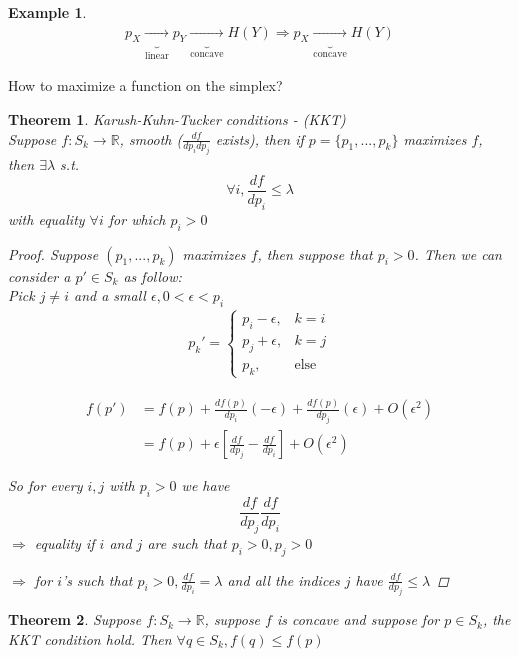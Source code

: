\documentclass[twoside]{article}
\newtheorem{theorem}{Theorem}[section]
\theoremstyle{definition} %
\newtheorem{example}{Example}
\def\R{\mathbb{R}}
\begin{document}
\begin{appendices}
\begin{example}
  \begin{align*}
    p_X \underbrace{\longrightarrow}_{\text{linear}} p_Y \underbrace{\longrightarrow}_{\text{concave}} H(Y)
    \Longrightarrow p_X \underbrace{\longrightarrow}_{\text{concave}} H(Y)
  \end{align*}
\end{example}

How to maximize a function on the simplex?

\begin{theorem}{Karush-Kuhn-Tucker conditions - (KKT)} \\
  Suppose $f: S_k \rightarrow \R$, smooth ($\frac{df}{dp_i dp_j}$ exists), then if $p = \{ p_1, ..., p_k\}$ maximizes $f$, then $\exists \lambda$ s.t.
  \[ \forall i, \frac{df}{d p_i} \leq \lambda \]
  with equality $\forall i$ for which $p_i > 0$

\begin{proof}
  Suppose $(p_1, ..., p_k)$ maximizes $f$, then suppose that $p_i > 0$. Then we can consider a $p' \in S_k$ as follow:\\
  Pick $j \neq i$ and a small $\epsilon, 0 < \epsilon < p_i$
  \begin{align*}
    p_k' =
    \left\{
    \begin{array}{ll}
      p_i - \epsilon, &k = i \\
      p_j + \epsilon, & k = j \\
      p_k, &\text{else}
    \end{array}
    \right.
  \end{align*}

  \begin{align*}
    f(p') &= f(p) + \frac{d f(p)}{d p_i}(- \epsilon) + \frac{d f(p)}{d p_j} (\epsilon) + O(\epsilon^2) \\
    &= f(p) + \epsilon \left[ \frac{df}{dp_j} - \frac{df}{dp_i} \right] + O(\epsilon^2)
  \end{align*}

  So for every $i, j$ with $p_i > 0$ we have
  \[ \frac{df}{dp_j} \frac{df}{dp_i} \]
  $\Rightarrow$ equality if $i$ and $j$ are such that $p_i > 0, p_j > 0$

  $\Rightarrow$ for $i$'s such that $p_i > 0, \frac{df}{dp_i} = \lambda$ and all the indices $j$ have $\frac{df}{dp_j} \leq \lambda$
\end{proof}

\end{theorem}

\begin{theorem}
  Suppose $f: S_k \rightarrow \R$, suppose $f$ is concave and suppose for $p \in S_k$, the KKT condition hold. Then $\forall q \in S_k, f(q) \leq f(p) $


\end{theorem}
\end{appendices}
\end{document}
